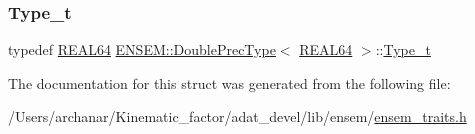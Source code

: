 \mbox{\label{structENSEM_1_1DoublePrecType_3_01REAL64_01_4_aa802de703a59b214ae8bb817ec704252}} 
\subsubsection{\texorpdfstring{Type\_t}{Type\_t}\hspace{0.1cm}{\footnotesize\ttfamily [2/2]}}
{\footnotesize\ttfamily typedef \mbox{\hyperlink{namespaceENSEM_a85b215b9f1f43715aebee01718e25082}{R\+E\+A\+L64}} \mbox{\hyperlink{structENSEM_1_1DoublePrecType}{E\+N\+S\+E\+M\+::\+Double\+Prec\+Type}}$<$ \mbox{\hyperlink{namespaceENSEM_a85b215b9f1f43715aebee01718e25082}{R\+E\+A\+L64}} $>$\+::\mbox{\hyperlink{structENSEM_1_1DoublePrecType_3_01REAL64_01_4_aa802de703a59b214ae8bb817ec704252}{Type\+\_\+t}}}



The documentation for this struct was generated from the following file\+:\begin{DoxyCompactItemize}
\item 
/\+Users/archanar/\+Kinematic\+\_\+factor/adat\+\_\+devel/lib/ensem/\mbox{\hyperlink{lib_2ensem_2ensem__traits_8h}{ensem\+\_\+traits.\+h}}\end{DoxyCompactItemize}
